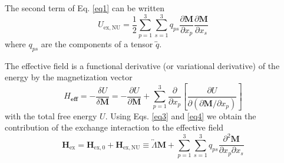 \documentclass[aps,prl,amsmath,amssymb,preprint,superscriptaddress]{revtex4-1}
\begin{document}
The second term of Eq. \eqref{eq1} can be written
\begin{equation}
    U_{\mathrm{ex,NU}} = \frac{1}{2} \sum_{p=1}^3 \sum_{s=1}^3 q_{ps} \frac{\partial \mathbf{M}}{\partial x_p} \frac{\partial \mathbf{M}}{\partial x_s}
    \label{eq3}
\end{equation}
where $q_{ps}$ are the components of a tensor $\overleftrightarrow{q}$.

The effective field is a functional derivative (or variational derivative) of the energy by the magnetization vector
\begin{equation}
    H_{\mathbf{eff}} = - \frac{\delta U}{\delta \mathbf{M}} = - \frac{\partial U}{\partial \mathbf{M}} + \sum_{p=1}^3 \frac{\partial}{\partial x_p} \left[ \frac{\partial U}{\partial \left(\partial \mathbf{M} / \partial x_{p} \right)} \right]
    \label{eq4}
\end{equation}
with the total free energy $U$.
Using Eqs. \eqref{eq3} and \eqref{eq4} we obtain the contribution of the exchange interaction to the effective field
\begin{equation}
    \mathbf{H}_{\mathrm{ex}} = \mathbf{H}_{\mathrm{ex,0}} + \mathbf{H}_{\mathrm{ex,NU}} \equiv \overleftrightarrow{\Lambda} \mathbf{M} + \sum_{p=1}^3 \sum_{s=1}^3 q_{ps} \frac{\partial^2 \mathbf{M}}{\partial x_p \partial x_s}
    \label{eq5}
\end{equation}
\end{document}
